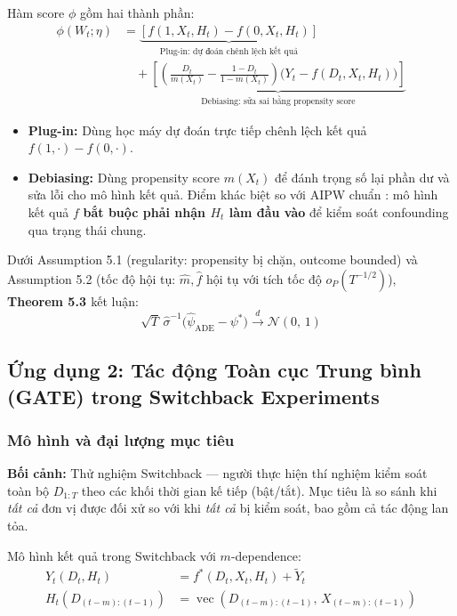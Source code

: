 Hàm score \(\phi\) gồm hai thành phần:
\begin{align}
    \phi(W_t;\eta) &= \underbrace{\left[ f(1,X_t,H_t) - f(0,X_t,H_t) \right]}_{\text{Plug-in: dự đoán chênh lệch kết quả}} \nonumber \\
    &\quad + \underbrace{\left[ \left(\frac{D_t}{m(X_t)} - \frac{1-D_t}{1-m(X_t)}\right) \bigl(Y_t - f(D_t,X_t,H_t)\bigr) \right]}_{\text{Debiasing: sửa sai bằng propensity score}}
\end{align}

\begin{itemize}
    \item \textbf{Plug-in:} Dùng học máy dự đoán trực tiếp chênh lệch kết quả \(f(1,\cdot) - f(0,\cdot)\).
    \item \textbf{Debiasing:} Dùng propensity score \(m(X_t)\) để đánh trọng số lại phần dư và sửa lỗi cho mô hình kết quả. Điểm khác biệt so với AIPW chuẩn \cite{robins1994estimation}: mô hình kết quả \(f\) \textbf{bắt buộc phải nhận \(H_t\) làm đầu vào} để kiểm soát confounding qua trạng thái chung.
\end{itemize}

Dưới Assumption 5.1 (regularity: propensity bị chặn, outcome bounded) và Assumption 5.2 (tốc độ hội tụ: \(\hat{m}, \hat{f}\) hội tụ với tích tốc độ \(o_P(T^{-1/2})\)), \textbf{Theorem 5.3 \cite{hays2025double}} kết luận:
\[
    \sqrt{T}\, \hat{\sigma}^{-1} \bigl(\hat{\psi}_{\text{ADE}} - \psi^*\bigr) \xrightarrow{d} \mathcal{N}(0,\, 1)
\]

\subsection{Ứng dụng 2: Tác động Toàn cục Trung bình (GATE) trong Switchback Experiments}

\subsubsection{Mô hình và đại lượng mục tiêu}

\textbf{Bối cảnh:} Thử nghiệm Switchback --- người thực hiện thí nghiệm kiểm soát toàn bộ \(D_{1:T}\) theo các khối thời gian kế tiếp (bật/tắt). Mục tiêu là so sánh khi \textit{tất cả} đơn vị được đối xử so với khi \textit{tất cả} bị kiểm soát, bao gồm cả tác động lan tỏa.

Mô hình kết quả trong Switchback với \(m\)-dependence:
\begin{align}
    Y_t(D_t, H_t) &= f^*(D_t, X_t, H_t) + \tilde{Y}_t \\
    H_t(D_{(t-m):(t-1)}) &= \operatorname{vec}(D_{(t-m):(t-1)},\, X_{(t-m):(t-1)})
\end{align}

